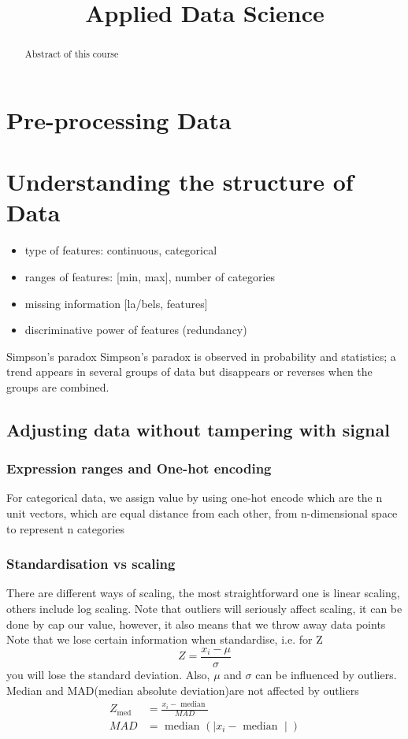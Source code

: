 \documentclass[12pt,a4paper]{article}
\newcommand{\topic}{Applied Data Science}
\begin{document}
\title{\topic}
\begin{titlepage}
    \maketitle
\end{titlepage}

\tableofcontents

\newpage
\begin{abstract}
\noindent
Abstract of this course
\end{abstract}
\section{Pre-processing Data}
\section{Understanding the structure of Data}
\begin{itemize}
    \item type of features: continuous, categorical
	\item ranges of features: [min, max], number of categories
	\item missing information [la/bels, features]
	\item discriminative power of features (redundancy)
\end{itemize}
\begin{theorem}
    {Simpson's paradox}
    {Simpson's paradox is observed in probability and statistics; a trend appears in several groups of data but disappears or reverses when the groups are combined.}
\end{theorem}

\subsection{Adjusting data without tampering with signal}
\subsubsection{Expression ranges and One-hot encoding}
For categorical data, we assign value by using one-hot encode which are the n unit vectors, which are equal distance from each other, from n-dimensional space to represent n categories
\subsubsection{Standardisation vs scaling}
There are different ways of scaling, the most straightforward one is linear scaling, others include log scaling.
Note that outliers will seriously affect scaling, it can be done by cap our value, however, it also means that we throw away data points
Note that we lose certain information when standardise, i.e. for Z 
$$
Z=\frac{x_i-\mu}{\sigma}
$$
you will lose the standard deviation.
Also, $\mu$ and $\sigma$ can be influenced by outliers. Median and MAD(median absolute deviation)are not affected by outliers
\begin{align}
    Z_{\text {med }} & =\frac{x_i-\text { median }}{M A D} \\
    M A D & =\text { median }\left(\mid x_i-\text { median } \mid\right)
\end{align} 
\end{document}
